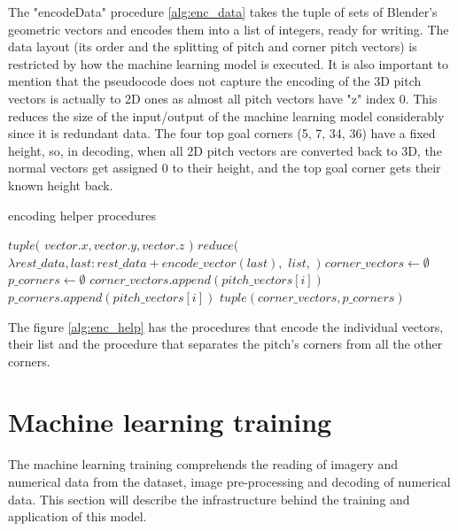 \documentclass[
    11pt,
    oneside
]{report}
\begin{document}
The "encodeData" procedure \ref{alg:enc_data} takes the tuple of sets of Blender's geometric vectors and encodes them into a list of integers, ready for writing. The data layout (its order and the splitting of pitch and corner pitch vectors) is restricted by how the machine learning model is executed. It is also important to mention that the pseudocode does not capture the encoding of the 3D pitch vectors is actually to 2D ones as almost all pitch vectors have "z" index 0. This reduces the size of the input/output of the machine learning model considerably since it is redundant data. The four top goal corners (5, 7, 34, 36) have a fixed height, so, in decoding, when all 2D pitch vectors are converted back to 3D, the normal vectors get assigned 0 to their height, and the top goal corner gets their known height back.


\begin{algorithm}[H]
\begin{algorithmic}
\caption{encoding helper procedures}\label{alg:enc_help}
    \Return $tuple($
        \State \indent $vector.x, vector.y, vector.z$
    \State $)$
\EndProcedure
{}
    \Return $reduce($
        \State \indent $\lambda rest\_data, last: rest\_data + encode\_vector(last),$
        \State \indent $list,$
        \State \indent \emptyset {}
    \State $)$
\EndProcedure
{}
    \State $corner\_vectors \gets \emptyset$
    \State $p\_corners \gets \emptyset$
            \State $corner\_vectors.append(pitch\_vectors[i])$
        \Else
            \State $p\_corners.append(pitch\_vectors[i])$
        \EndIf
    \EndFor
    \State
    \Return $tuple(corner\_vectors, p\_corners)$
\EndProcedure
\end{algorithmic}
\end{algorithm}


The figure \ref{alg:enc_help} has the procedures that encode the individual vectors, their list and the procedure that separates the pitch's corners from all the other corners.




\section{Machine learning training}


The machine learning training comprehends the reading of imagery and numerical data from the dataset, image pre-processing and decoding of numerical data. This section will describe the infrastructure behind the training and application of this model.
\end{document}
